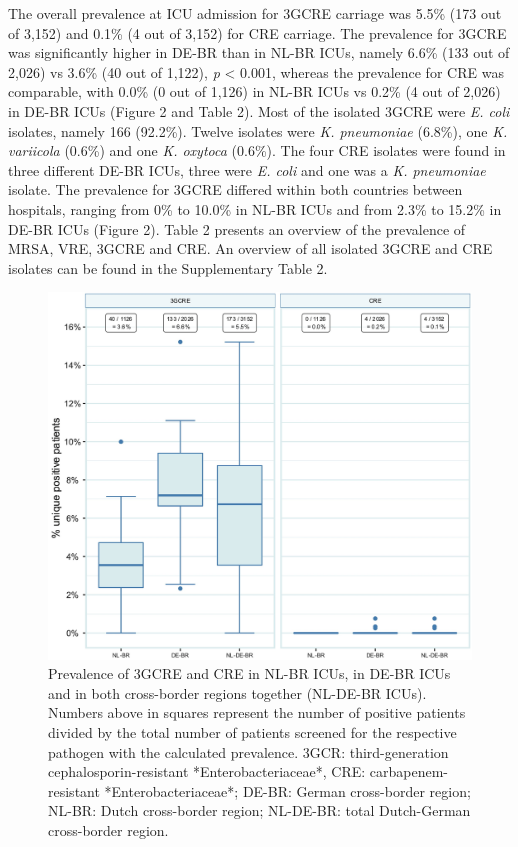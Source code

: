 \documentclass[
]{book}
\begin{document}
The overall prevalence at ICU admission for 3GCRE carriage was 5.5\% (173 out of 3,152) and 0.1\% (4 out of 3,152) for CRE carriage. The prevalence for 3GCRE was significantly higher in DE-BR than in NL-BR ICUs, namely 6.6\% (133 out of 2,026) vs 3.6\% (40 out of 1,122), \emph{p} \textless{} 0.001, whereas the prevalence for CRE was comparable, with 0.0\% (0 out of 1,126) in NL-BR ICUs vs 0.2\% (4 out of 2,026) in DE-BR ICUs (Figure 2 and Table 2). Most of the isolated 3GCRE were \emph{E. coli} isolates, namely 166 (92.2\%). Twelve isolates were \emph{K. pneumoniae} (6.8\%), one \emph{K. variicola} (0.6\%) and one \emph{K. oxytoca} (0.6\%). The four CRE isolates were found in three different DE-BR ICUs, three were \emph{E. coli} and one was a \emph{K. pneumoniae} isolate. The prevalence for 3GCRE differed within both countries between hospitals, ranging from 0\% to 10.0\% in NL-BR ICUs and from 2.3\% to 15.2\% in DE-BR ICUs (Figure 2). Table 2 presents an overview of the prevalence of MRSA, VRE, 3GCRE and CRE. An overview of all isolated 3GCRE and CRE isolates can be found in the Supplementary Table 2.

\begin{figure}

{\centering \includegraphics[width=1\linewidth]{images/10-02} 

}

\caption{Prevalence of 3GCRE and CRE in NL-BR ICUs, in DE-BR ICUs and in both cross-border regions together (NL-DE-BR ICUs). Numbers above in squares represent the number of positive patients divided by the total number of patients screened for the respective pathogen with the calculated prevalence. 3GCR: third-generation cephalosporin-resistant *Enterobacteriaceae*, CRE: carbapenem-resistant *Enterobacteriaceae*; DE-BR: German cross-border region; NL-BR: Dutch cross-border region; NL-DE-BR: total Dutch-German cross-border region.}\label{fig:fig10-2}
\end{figure}
\end{document}
